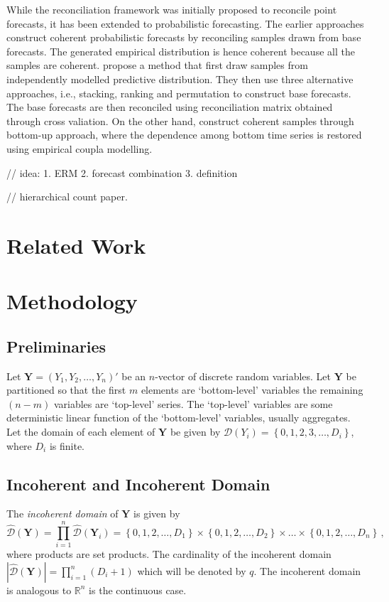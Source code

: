 \documentclass[a4paper,review,12pt,authoryear]{elsarticle}
\newcommand{\bY}{\mathbf{Y}}
\begin{document}
While the reconciliation framework was initially proposed to reconcile point forecasts, it has been extended to probabilistic forecasting. 
The earlier approaches construct coherent probabilistic forecasts by reconciling samples drawn from base forecasts. 
The generated empirical distribution is hence coherent because all the samples are coherent.
\cite{jeonProbabilisticForecastReconciliation2019} propose a method that first draw samples from independently modelled predictive distribution. 
They then use three alternative approaches, i.e., stacking, ranking and permutation to construct base forecasts. 
The base forecasts are then reconciled using reconciliation matrix obtained through cross valiation. 
On the other hand, \cite{bentaiebHierarchicalProbabilisticForecasting2020} construct coherent samples through bottom-up approach, 
where the dependence among bottom time series is restored using empirical coupla modelling.
  


// idea: 1. ERM  2. forecast combination 3. definition

// hierarchical count paper.

\section{Related Work}
\section{Methodology}


	\subsection{Preliminaries}
	Let $\bY=\left(Y_1,Y_2,\ldots,Y_n\right)'$ be an $n$-vector of discrete random variables. Let $\bY$ be partitioned so that the first $m$ elements are `bottom-level' variables the remaining $(n-m)$ variables are `top-level' series. The `top-level' variables are some deterministic linear function of the `bottom-level' variables, usually aggregates. Let the domain of each element of $\bY$ be given by $\mathcal{D}(Y_i)=\left\{0, 1,2,3,\dots,D_i\right\}$, where $D_i$ is finite.
	
	\subsection{Incoherent and Incoherent Domain}
	The \textit{incoherent domain} of $\bY$ is given by
	\[
	\hat{\mathcal D}(\bY)=\prod\limits_{i=1}^n\hat{\mathcal D}(\bY_i)=\left\{0, 1,2,\dots,D_1\right\}\times\left\{0,1,2,\dots,D_2\right\}\times\dots\times\left\{0,1,2,\dots,D_n\right\}\,,
	\] 
    where products are set products. The cardinality of the incoherent domain $|\hat{\mathcal D}(\bY)|=\prod\limits_{i=1}^{n} (D_i+1)$ which will be denoted by $q$. The incoherent domain is analogous to $\mathbb{R}^n$ is the continuous case.
    
\end{document}
